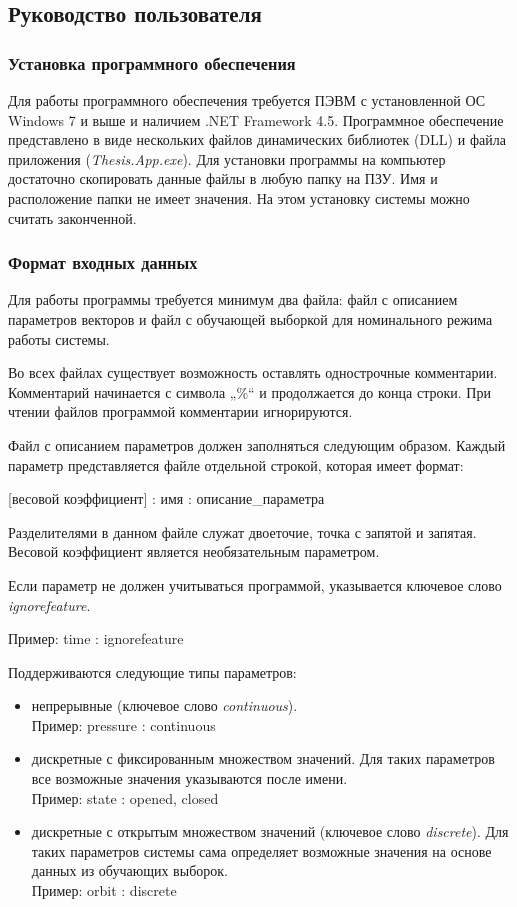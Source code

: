 ﻿\subsection{Руководство пользователя}
\subsubsection{Установка программного обеспечения}
Для работы программного обеспечения требуется ПЭВМ с установленной ОС Windows 7 и выше и наличием .NET Framework 4.5. Программное обеспечение представлено в виде нескольких файлов динамических библиотек (DLL) и файла приложения (\textit{Thesis.App.exe}). Для установки программы на компьютер достаточно скопировать данные файлы в любую папку на ПЗУ. Имя и расположение папки не имеет значения. На этом установку системы можно считать законченной.

\subsubsection{Формат входных данных}
Для работы программы требуется минимум два файла: файл с описанием параметров векторов и файл с обучающей выборкой для номинального режима работы системы.

Во всех файлах существует возможность оставлять однострочные комментарии. Комментарий начинается с символа „\%“ и продолжается до конца строки. При чтении файлов программой комментарии игнорируются.

Файл с описанием параметров должен заполняться следующим образом. Каждый параметр представляется файле отдельной строкой, которая имеет формат:

\textsf{[весовой коэффициент] : имя : описание\_параметра}

Разделителями в данном файле служат двоеточие, точка с запятой и запятая. Весовой коэффициент является необязательным параметром.

Если параметр не должен учитываться программой, указывается ключевое слово \textit{ignorefeature}.

Пример: \textsf{time : ignorefeature}

Поддерживаются следующие типы параметров:
\begin{itemize}
	\item непрерывные (ключевое слово \textit{continuous}). \\ Пример: \textsf{pressure : continuous}
	\item дискретные с фиксированным множеством значений. Для таких параметров все возможные значения указываются после имени. \\ Пример: \textsf{state : opened, closed}
	\item дискретные с открытым множеством значений (ключевое слово \textit{discrete}). Для таких параметров системы сама определяет возможные значения на основе данных из обучающих выборок. \\ Пример: \textsf{orbit : discrete}
\end{itemize}

